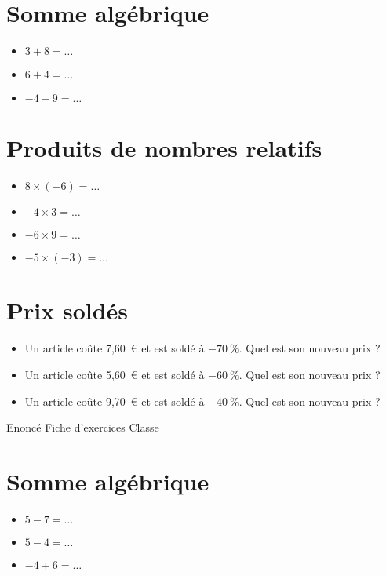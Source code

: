 \documentclass[a4paper,11pt,fleqn]{article}
\begin{document}
\section{Somme algébrique}
\begin{itemize}

  \item $3 +8=\ldots$
  \item $6 +4=\ldots$
  \item $-4 -9=\ldots$
\end{itemize}


\section{Produits de nombres relatifs}
\begin{itemize}

  \item $8\times(-6)=\ldots$
  \item $-4\times3=\ldots$
  \item $-6\times9=\ldots$
  \item $-5\times(-3)=\ldots$
\end{itemize}


\section{Prix soldés}
\begin{itemize}

  \item Un article coûte 7,60~€ et est soldé à $-70~\%$. Quel est son nouveau prix ?
  \item Un article coûte 5,60~€ et est soldé à $-60~\%$. Quel est son nouveau prix ?
  \item Un article coûte 9,70~€ et est soldé à $-40~\%$. Quel est son nouveau prix ?
\end{itemize}
\newpage
\setcounter{exo}{0}
\setcounter{section}{0}
{Enoncé} \hfill {\huge Fiche d'exercices } \hfill {Classe}

\section{Somme algébrique}
\begin{itemize}

  \item $5 -7=\ldots$
  \item $5 -4=\ldots$
  \item $-4 +6=\ldots$
\end{itemize}
\end{document}

